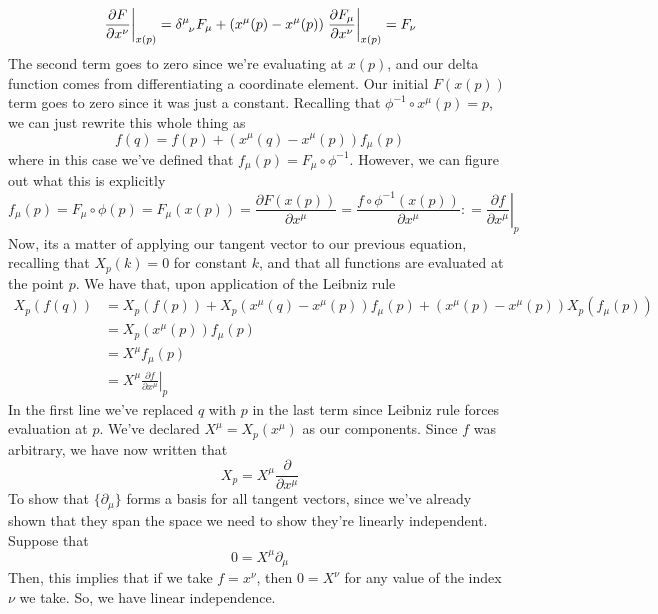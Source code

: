 \[ 
\left. \frac{ \partial F}{ \partial x^\nu } \right\vert_{ x(p)}  = \delta\indices{^\mu_\nu} F_\mu + (x^\mu (p)  - x^\mu( p) ) \left. \frac{ \partial F_\mu}{ \partial x^\nu } \right\vert_{ x( p)}  = F_\nu \] 
The second term goes to zero since we're evaluating at $x(p)$, and our delta function comes from differentiating a coordinate element. Our initial $F(x(p))$ term goes to zero since it was just a constant. Recalling that $\phi^{ -1} \circ x^\mu ( p )  = p$, we can just rewrite this whole thing as 
\[ 
f(q) = f(p) + (x^\mu (q) - x^\mu ( p)) f_\mu (p ) 
\] 
where in this case we've defined that $f_\mu (p ) = F_\mu \circ \phi^{ - 1} $. However, we can figure out what this is explicitly
\[ 
f_\mu ( p ) = F_\mu \circ \phi ( p )  = F_\mu ( x(p)) =  \frac{\partial F (x(p)) }{ \partial x^\mu } = \frac{ f \circ \phi^{ -1 } ( x (p))}{ \partial x^\mu } : = \left. \frac{ \partial f}{ \partial x^\mu } \right\vert_{ p } 
\] 
Now, its a matter of applying our tangent vector to our previous equation, recalling that $X_p (k ) = 0 $ for constant $k$, and that all functions are evaluated at the point $ p$. We have that, upon application of the Leibniz rule 
\begin{align*} 
X_p ( f(q)) & = X_p ( f(p)) + X_p ( x^\mu (q) - x^\mu (p) ) f_\mu (p) + ( x^\mu (p) - x^\mu(p) )X_p ( f_\mu ( p)) \\
& = X_p ( x^\mu (p)) f_\mu ( p) \\
&= X^\mu f_\mu ( p) \\
&= X^\mu \left. \frac{ \partial f }{ \partial x^\mu } \right\vert_p 
\end{align*} 
In the first line we've replaced $q$ with $p$ in the last term since Leibniz rule forces evaluation at $p$. We've declared $X^\mu = X_p (x^\mu) $ as our components. Since $f$ was arbitrary, we have now written that 
\[ 
X_p = X^\mu \frac{ \partial }{ \partial x^\mu } 
\] 
To show that $\{ \partial_\mu \} $ forms a basis for all tangent vectors, since we've already shown that they span the space we need to show they're linearly independent. Suppose that 
\[ 
0 = X^\mu \partial_\mu
\] 
Then, this implies that if we take $f = x^\nu$, then $0 = X^\nu$ for any value of the index $\nu$ we take. So, we have linear independence.   

